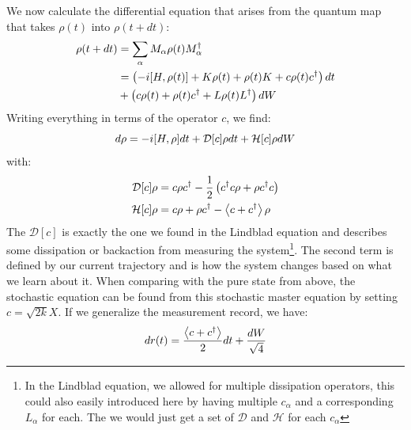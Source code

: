 We now calculate the differential equation that arises from the quantum map that takes $\rho(t)$ into $\rho(t+dt)$:
\begin{align}
    \rho(t+dt) &= \sum_\alpha M_\alpha \rho(t) M_\alpha^\dagger \\
               &= \left(-i \comm{H}{\rho(t)} + K\rho(t) + \rho(t)K + c\rho(t)c^\dagger \right) dt \\
            &+\left(c\rho(t) + \rho(t)c^\dagger  + L\rho(t) L^\dagger \right)dW 
\end{align}
Writing everything in terms of the operator $c$, we find:
\begin{equation}
    d\rho = -i \comm{H}{\rho}dt + \mathcal{D}[c]\rho dt + \mathcal{H}[c] \rho dW
\end{equation}
with:
\begin{align}
    \mathcal{D}[c] \rho &= c\rho c^\dagger - \frac12 \left(c^\dagger c \rho + \rho c^\dagger c\right) \\ 
    \mathcal{H}[c] \rho &= c\rho + \rho c^\dagger - \expval{c + c^\dagger}\rho
\end{align}
The $\mathcal{D}[c]$ is exactly the one we found in the Lindblad equation and describes some dissipation or backaction from measuring the system\footnote{In the Lindblad equation, we allowed for multiple dissipation operators, this could also easily introduced here by having multiple $c_\alpha$ and a corresponding $L_\alpha$ for each. The we would just get a set of $\mathcal{D}$ and $\mathcal{H}$ for each $c_\alpha$}. The second term is defined by our current trajectory and is how the system changes based on what we learn about it. When comparing with the pure state from above, the stochastic equation can be found from this stochastic master equation by setting $c = \sqrt{2k}X$. If we generalize the measurement record, we have:
\begin{equation}
    dr(t) = \frac{\expval{c + c^\dagger}}{2}dt + \frac{dW}{\sqrt{4}}
\end{equation}

